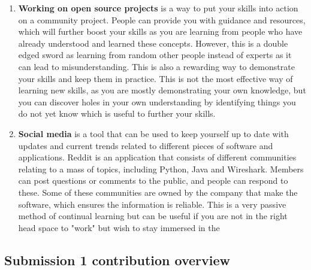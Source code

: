 \documentclass[a4paper, 11pt]{report}
\begin{document}
\begin{enumerate}
    \item \textbf{Working on open source projects} is a way to put your skills into action on a community project. People can provide you with guidance and resources, which will further boost your skills as you are learning from people who have already understood and learned these concepts. However, this is a double edged sword as learning from random other people instead of experts as it can lead to misunderstanding. This is also a rewarding way to demonstrate your skills and keep them in practice. This is not the most effective way of learning new skills, as you are mostly demonstrating your own knowledge, but you can discover holes in your own understanding by identifying things you do not yet know which is useful to further your skills.
    \item \textbf{Social media} is a tool that can be used to keep yourself up to date with updates and current trends related to different pieces of software and applications. Reddit is an application that consists of different communities relating to a mass of topics, including Python, Java and Wireshark. Members can post questions or comments to the public, and people can respond to these. Some of these communities are owned by the company that make the software, which ensures the information is reliable. This is a very passive method of continual learning but can be useful if you are not in the right head space to "work" but wish to stay immersed in the 
\end{enumerate}

\subsection{Submission 1 contribution overview}
\end{document}
